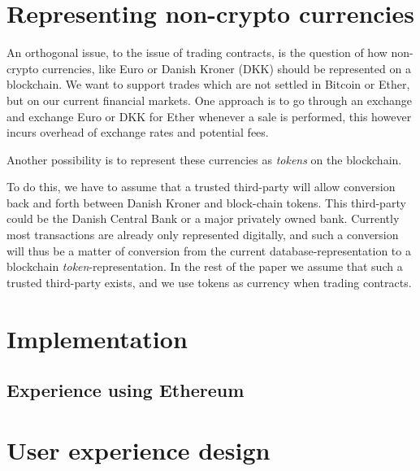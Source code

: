 \documentclass[oneside,a4paper,10pts,article]{memoir}
\begin{document}
\chapter{Representing non-crypto currencies}
\label{sec:currency}
An orthogonal issue, to the issue of trading contracts, is the
question of how non-crypto currencies, like Euro or Danish Kroner
(DKK) should be represented on a blockchain. We want to support trades
which are not settled in Bitcoin or Ether, but on our current
financial markets. One approach is to go through an exchange and
exchange Euro or DKK for Ether whenever a sale is performed, this
however incurs overhead of exchange rates and potential fees.

Another possibility is to represent these currencies as
\textit{tokens} on the blockchain. 

To do this, we have to assume that a trusted third-party will allow
conversion back and forth between Danish Kroner and block-chain
tokens. This third-party could be the Danish Central Bank or a major
privately owned bank. Currently most transactions are already only
represented digitally, and such a conversion will thus be a matter of
conversion from the current database-representation to a blockchain
\emph{token}-representation. In the rest of the paper we assume that
such a trusted third-party exists, and we use tokens as currency when
trading contracts.

\chapter{Implementation}
\label{sec:implementation}


\section{Experience using Ethereum}




\chapter{User experience design}
\end{document}
